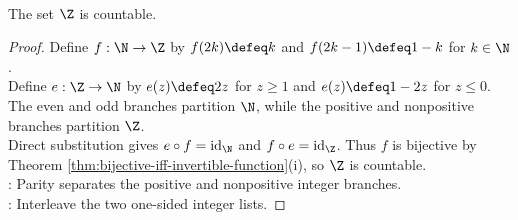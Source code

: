 \begin{proposition} \label{prop:integers-countable} \\
The set $\Z$ is countable.
\begin{proof}
Define $f:\N\to\Z$ by $f(2k)\defeq k$ and $f(2k-1)\defeq 1-k$ for $k\in\N$.\\
Define $e:\Z\to\N$ by $e(z)\defeq 2z$ for $z\geq1$ and $e(z)\defeq 1-2z$ for $z\leq0$.\\
The even and odd branches partition $\N$, while the positive and nonpositive branches partition $\Z$.\\
Direct substitution gives $e\circ f=\operatorname{id}_{\N}$ and $f\circ e=\operatorname{id}_{\Z}$. Thus $f$ is bijective by Theorem \ref{thm:bijective-iff-invertible-function}(i), so $\Z$ is countable.\\
: Parity separates the positive and nonpositive integer branches.\\
: Interleave the two one-sided integer lists.
\end{proof}
\end{proposition}

